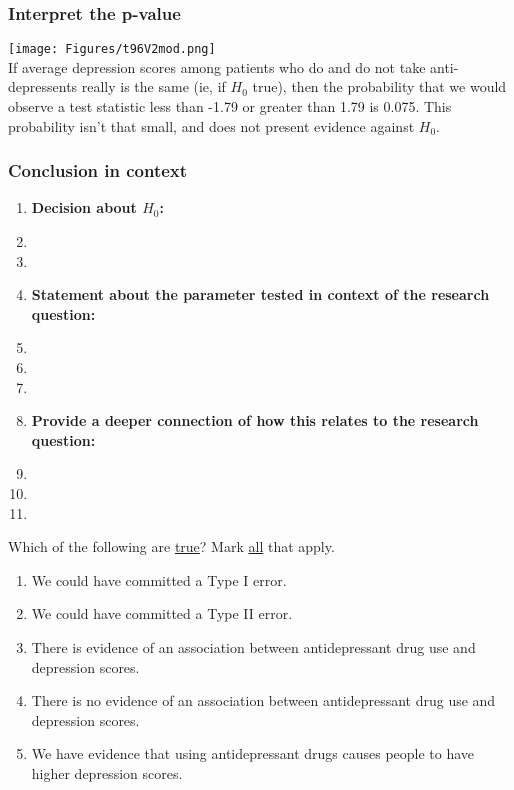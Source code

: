 \begin{frame}
\frametitle{Interpret the p-value}
\texttt{[image: Figures/t96V2mod.png]}\\
If average depression scores among patients who do and do not take anti-depressents really is the same (ie, if $H_0$ true), then the probability that we would observe a test statistic less than -1.79 or greater than 1.79 is 0.075.  This probability isn't that small, and does not present evidence against $H_0$.
\end{frame}

\begin{frame}
\frametitle{Conclusion in context}
\begin{enumerate}
    \item \textbf{Decision about $H_0$:}
    \item[]
    \item[]
    \item \textbf{Statement about the parameter tested in context of the research question:}
    \item[]
    \item[]
    \item[]
    \item \textbf{Provide a deeper connection of how this relates to the research question:}
    \item[]
    \item[]
    \item[]
\end{enumerate}
\end{frame}


\begin{frame}
\begin{clicker}{Which of the following are \underline{true}?  Mark \underline{all} that apply.}
\begin{enumerate}
    \item
    We could have committed a Type I error.
    \item
    We could have committed a Type II error.
    \item
    There is evidence of an association between antidepressant drug use and depression scores.
    \item
    There is no evidence of an association between antidepressant drug use and depression scores.
    \item
    We have evidence that using antidepressant drugs causes people to have higher depression scores.
\end{enumerate}
\end{clicker}
\end{frame}



